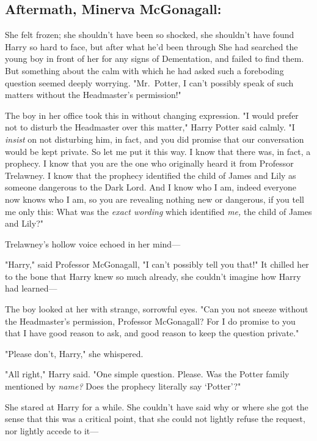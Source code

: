 \subsection{Aftermath, Minerva McGonagall:}

She felt frozen; she shouldn't have been so shocked, she shouldn't have found
Harry so hard to face, but after what he'd been through{\el} She had
searched the young boy in front of her for any signs of Dementation, and failed
to find them. But something about the calm with which he had asked such a
foreboding question seemed deeply worrying. "Mr.~Potter, I can't possibly speak
of such matters without the Headmaster's permission!"

The boy in her office took this in without changing expression. "I would prefer
not to disturb the Headmaster over this matter," Harry Potter said calmly. "I
\emph{insist} on not disturbing him, in fact, and you did promise that our
conversation would be kept private. So let me put it this way. I know that
there was, in fact, a prophecy. I know that you are the one who originally
heard it from Professor Trelawney. I know that the prophecy identified the
child of James and Lily as someone dangerous to the Dark Lord. And I know who I
am, indeed everyone now knows who I am, so you are revealing nothing new or
dangerous, if you tell me only this: What was the \emph{exact wording} which
identified \emph{me,} the child of James and Lily?"

Trelawney's hollow voice echoed in her mind---


"Harry," said Professor McGonagall, "I can't possibly tell you that!" It
chilled her to the bone that Harry knew so much already, she couldn't imagine
how Harry had learned---

The boy looked at her with strange, sorrowful eyes. "Can you not sneeze without
the Headmaster's permission, Professor McGonagall? For I do promise to you that
I have good reason to ask, and good reason to keep the question private."

"Please don't, Harry," she whispered.

"All right," Harry said. "One simple question. Please. Was the Potter family
mentioned by \emph{name?} Does the prophecy literally say `Potter'?"

She stared at Harry for a while. She couldn't have said why or where she got
the sense that this was a critical point, that she could not lightly refuse the
request, nor lightly accede to it---

